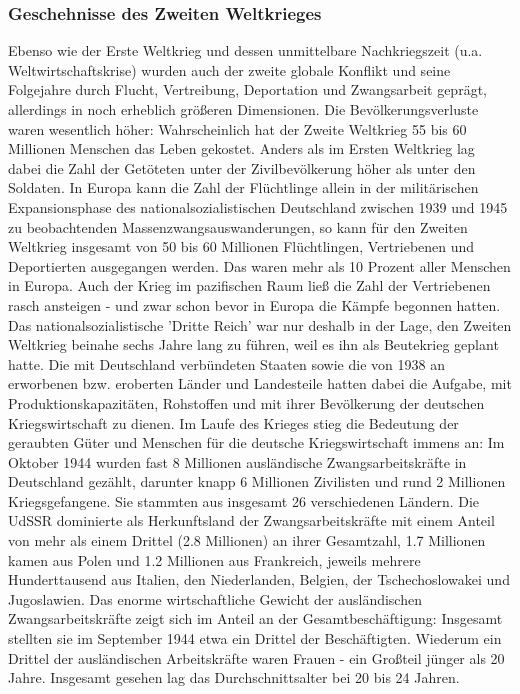 \documentclass[letterpaper, 12pt]{article}
\let\tempsubsubsection\subsubsection
\renewcommand\subsubsection[1]{\vspace{0cm}\tempsubsubsection{#1}\vspace{0cm}}
\begin{document}
\subsubsection{Geschehnisse des Zweiten Weltkrieges}

Ebenso wie der Erste Weltkrieg und dessen unmittelbare Nachkriegszeit (u.a. Weltwirtschaftskrise) wurden auch der zweite globale Konflikt und seine Folgejahre durch Flucht, Vertreibung, Deportation und Zwangsarbeit geprägt, allerdings in noch erheblich größeren Dimensionen. Die Bevölkerungsverluste waren wesentlich höher: Wahrscheinlich hat der Zweite Weltkrieg 55 bis 60 Millionen Menschen das Leben gekostet. Anders als im Ersten Weltkrieg lag dabei die Zahl der Getöteten unter der Zivilbevölkerung höher als unter den Soldaten. In Europa kann die Zahl der Flüchtlinge allein in der militärischen Expansionsphase des nationalsozialistischen Deutschland zwischen 1939 und 1945 zu beobachtenden Massenzwangsauswanderungen, so kann für den Zweiten Weltkrieg insgesamt von 50 bis 60 Millionen Flüchtlingen, Vertriebenen und Deportierten ausgegangen werden. Das waren mehr als 10 Prozent aller Menschen in Europa. Auch der Krieg im pazifischen Raum ließ die Zahl der Vertriebenen rasch ansteigen - und zwar schon bevor in Europa die Kämpfe begonnen hatten. \\
Das nationalsozialistische 'Dritte Reich' war nur deshalb in der Lage, den Zweiten Weltkrieg beinahe sechs Jahre lang zu führen, weil es ihn als Beutekrieg geplant hatte. Die mit Deutschland verbündeten Staaten sowie die von 1938 an erworbenen bzw. eroberten Länder und Landesteile hatten dabei die Aufgabe, mit Produktionskapazitäten, Rohstoffen und mit ihrer Bevölkerung der deutschen Kriegswirtschaft zu dienen. Im Laufe des Krieges stieg die Bedeutung der geraubten Güter und Menschen für die deutsche Kriegswirtschaft immens an: Im Oktober 1944 wurden fast 8 Millionen ausländische Zwangsarbeitskräfte in Deutschland gezählt, darunter knapp 6 Millionen Zivilisten und rund 2 Millionen Kriegsgefangene. Sie stammten aus insgesamt 26 verschiedenen Ländern. Die UdSSR dominierte als Herkunftsland der Zwangsarbeitskräfte mit einem Anteil von mehr als einem Drittel (2.8 Millionen) an ihrer Gesamtzahl, 1.7 Millionen kamen aus Polen und 1.2 Millionen aus Frankreich, jeweils mehrere Hunderttausend aus Italien, den Niederlanden, Belgien, der Tschechoslowakei und Jugoslawien. Das enorme wirtschaftliche Gewicht der ausländischen Zwangsarbeitskräfte zeigt sich im Anteil an der Gesamtbeschäftigung: Insgesamt stellten sie im September 1944 etwa ein Drittel der Beschäftigten. Wiederum ein Drittel der ausländischen Arbeitskräfte waren Frauen - ein Großteil jünger als 20 Jahre. Insgesamt gesehen lag das Durchschnittsalter bei 20 bis 24 Jahren. \\
\end{document}

